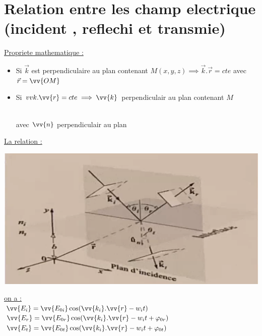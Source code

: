 \documentclass[12pt]{book}
\begin{document}
        \section{Relation entre les champ electrique (incident , reflechi et transmie)}
            \underline{Propriete mathematique :} 
            \begin{itemize}
                \item Si $\vec{k}$ est perpendiculaire au plan contenant $M(x,y,z) \implies \vec{k}.\vec{r} = cte$ avec $\vec{r}=\vv{OM}$
                \item Si $vv{k}.\vv{r} =cte \implies \vv{k} $ perpendiculair au plan contenant $M$ 
                \begin{center}
                     \\
                    avec $\vv{n}$ perpendiculair au plan
                \end{center}
            \end{itemize}
            \underline{La relation :} 
            \begin{center}
                \includegraphics[width = 0.6\linewidth]{pic/incident_reflechie_transmims.png}
            \end{center}
            \underline{on a :} \\
                $ \vv{E_i} = \vv{E_{0i}}\cos(\vv{k_i}.\vv{r}-w_it) $ \\
                $ \vv{E_r} = \vv{E_{0r}}\cos(\vv{k_i}.\vv{r}-w_it + \varphi_{0r}) $ \\
                $ \vv{E_t} = \vv{E_{0t}}\cos(\vv{k_i}.\vv{r}-w_it + \varphi_{0t}) $ \\
                
\end{document}
